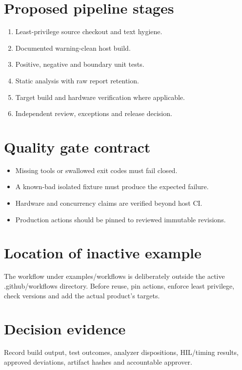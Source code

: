 \documentclass[10pt,letterpaper]{article}
\begin{document}
\makedoctitle
\makedocsummary
\section{Proposed pipeline stages}
\begin{enumerate}
\item Least-privilege source checkout and text hygiene.
\item Documented warning-clean host build.
\item Positive, negative and boundary unit tests.
\item Static analysis with raw report retention.
\item Target build and hardware verification where applicable.
\item Independent review, exceptions and release decision.
\end{enumerate}

\section{Quality gate contract}
\begin{itemize}
\item Missing tools or swallowed exit codes must fail closed.
\item A known-bad isolated fixture must produce the expected failure.
\item Hardware and concurrency claims are verified beyond host CI.
\item Production actions should be pinned to reviewed immutable revisions.
\end{itemize}

\section{Location of inactive example}
The workflow under examples/workflows is deliberately outside the active .github/workflows directory. Before reuse, pin actions, enforce least privilege, check versions and add the actual product's targets.
\section{Decision evidence}
Record build output, test outcomes, analyzer dispositions, HIL/timing results, approved deviations, artifact hashes and accountable approver.
\end{document}
